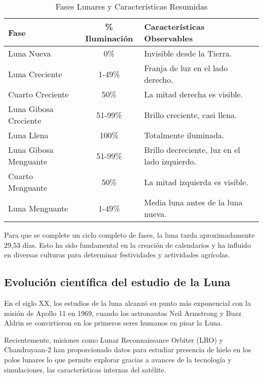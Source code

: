 \begin{table}[h]
    \centering
    \renewcommand{\arraystretch}{1.2} %
    \begin{tabular}{|l|c|p{7cm}|}
        \hline
        \textbf{Fase} & \textbf{\% Iluminación} & \textbf{Características Observables} \\
        \hline
        Luna Nueva & 0\% & Invisible desde la Tierra. \\
        \hline
        Luna Creciente & 1-49\% & Franja de luz en el lado derecho. \\
        \hline
        Cuarto Creciente & 50\% & La mitad derecha es visible. \\
        \hline
        Luna Gibosa Creciente & 51-99\% & Brillo creciente, casi llena. \\
        \hline
        Luna Llena & 100\% & Totalmente iluminada. \\
        \hline
        Luna Gibosa Menguante & 51-99\% & Brillo decreciente, luz en el lado izquierdo. \\
        \hline
        Cuarto Menguante & 50\% & La mitad izquierda es visible. \\
        \hline
        Luna Menguante & 1-49\% & Media luna antes de la luna nueva. \\
        \hline
    \end{tabular}
    \caption{Fases Lunares y Características Resumidas}
    \label{tabla:fases_lunares}
\end{table}

Para que se complete un ciclo completo de fases, la luna tarda aproximadamente 29,53 días. Esto ha sido fundamental en la creación de calendarios y ha influido en diversas culturas para determinar
festividades y actividades agrícolas.

\subsection{Evolución científica del estudio de la Luna}

En el siglo XX, los estudios de la luna alcanzó su punto más exponencial con la misión de Apollo 11 en 1969, cuando
los astronautas Neil Armstrong y Buzz Aldrin se convirtieron en los primeros seres humanos en pisar la Luna.

Recientemente, misiones como  Lunar Reconnaissance Orbiter (LRO) y Chandrayaan-2 \cite{Singh2022} han proporcionado datos para
estudiar presencia de hielo en los polos lunares lo que permite explorar gracias a avances de la tecnología y simulaciones, las
características internas del satélite.

